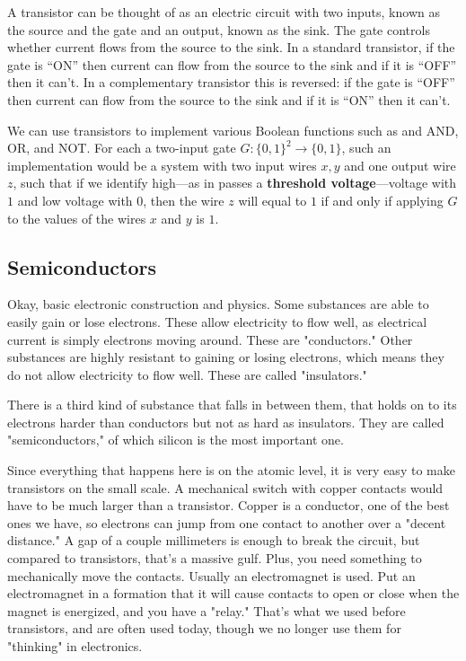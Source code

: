   A transistor can be thought of as an electric circuit with two inputs, known as the source and the gate and an output, known as the sink. The gate controls whether current flows from the source to the sink. In a standard transistor, if the gate is “ON” then current can flow from the source to the sink and if it is “OFF” then it can’t. In a complementary transistor this is reversed: if the gate is “OFF” then current can flow from the source to the sink and if it is “ON” then it can’t. 

  We can use transistors to implement various Boolean functions such as and AND, OR, and NOT. For each a two-input gate $G: \{0,1\}^2 \to \{0,1\}$, such an implementation would be a system with two input wires $x, y$ and one output wire $z$, such that if we identify high---as in passes a \textbf{threshold voltage}---voltage with $1$ and low voltage with $0$, then the wire $z$ will equal to $1$ if and only if applying $G$ to the values of the wires $x$ and $y$ is $1$. 

\subsection{Semiconductors}

  Okay, basic electronic construction and physics. Some substances are able to easily gain or lose electrons. These allow electricity to flow well, as electrical current is simply electrons moving around. These are "conductors." Other substances are highly resistant to gaining or losing electrons, which means they do not allow electricity to flow well. These are called "insulators."

  There is a third kind of substance that falls in between them, that holds on to its electrons harder than conductors but not as hard as insulators. They are called "semiconductors," of which silicon is the most important one. 

  Since everything that happens here is on the atomic level, it is very easy to make transistors on the small scale. A mechanical switch with copper contacts would have to be much larger than a transistor. Copper is a conductor, one of the best ones we have, so electrons can jump from one contact to another over a "decent distance." A gap of a couple millimeters is enough to break the circuit, but compared to transistors, that's a massive gulf. Plus, you need something to mechanically move the contacts. Usually an electromagnet is used. Put an electromagnet in a formation that it will cause contacts to open or close when the magnet is energized, and you have a "relay." That's what we used before transistors, and are often used today, though we no longer use them for "thinking" in electronics.

